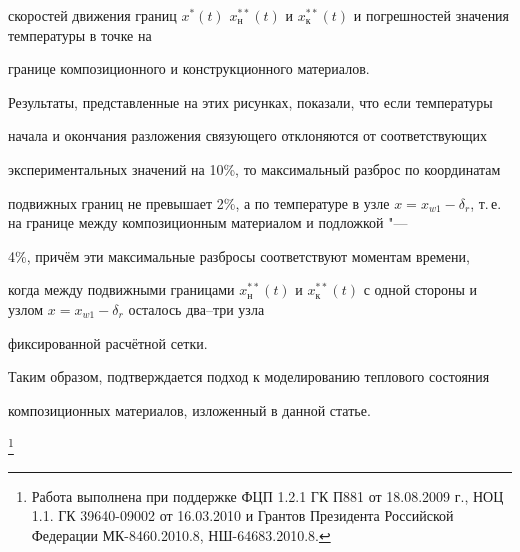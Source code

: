 скоростей движения границ $x^\ast (t)$ $x_\text{н}^{\ast \ast }(t)$ и $x_\text{к}^{\ast

\ast } ( t )$ и погрешностей значения температуры в точке на

границе композиционного и конструкционного материалов.





Результаты, представленные на этих рисунках, показали, что если температуры

начала и окончания разложения связующего отклоняются от соответствующих

экспериментальных значений на 10{\%}, то максимальный разброс по координатам

подвижных границ не превышает 2{\%}, а по температуре в узле $x=x_{w1} -\delta_r$, т.\,е. на границе между композиционным материалом и подложкой "---

4{\%}, причём эти максимальные разбросы соответствуют моментам времени,

когда между подвижными границами $x_\text{н}^{\ast \ast } (t)$ и $x_\text{к}^{\ast \ast }

(t)$ с одной стороны и узлом $x=x_{w1} -\delta _r$ осталось два--три узла

фиксированной расчётной сетки.













Таким образом, подтверждается подход к моделированию теплового состояния

композиционных материалов, изложенный в данной статье.







\thanks{Работа выполнена при  поддержке ФЦП 1.2.1 ГК П881 от 18.08.2009 г., НОЦ 1.1. ГК 39640-09002 от 16.03.2010 и Грантов  Президента Российской Федерации МК-8460.2010.8, НШ-64683.2010.8.}







